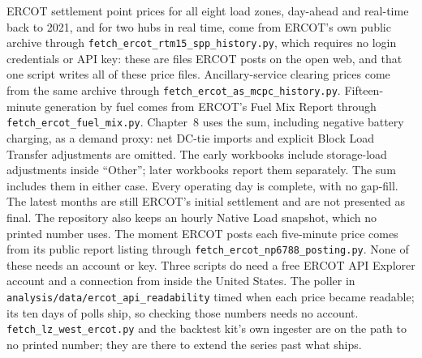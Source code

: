 ERCOT settlement point prices for all
eight load zones, day-ahead and real-time back to 2021, and for two hubs in real time, come from ERCOT's own
public archive through \texttt{fetch\_ercot\_rtm15\_spp\_history.py}, which
requires no login credentials or API key: these are files ERCOT posts on the
open web, and that one script writes all of these price files. Ancillary-service clearing
prices come from the same archive through
\texttt{fetch\_ercot\_as\_mcpc\_history.py}. Fifteen-minute generation by fuel comes from
ERCOT's Fuel Mix Report through \texttt{fetch\_ercot\_fuel\_mix.py}.
Chapter~8 uses the sum, including negative battery charging, as a demand proxy:
net DC-tie imports and explicit Block Load Transfer adjustments are omitted.
The early workbooks include storage-load adjustments inside ``Other''; later
workbooks report them separately. The sum includes them in either case.
Every operating day is complete, with no gap-fill.
The latest months are still ERCOT's initial settlement and are not presented as final. The repository also keeps an hourly Native Load snapshot, which no printed number uses.
The moment ERCOT posts each five-minute price comes from its public report
listing through \texttt{fetch\_ercot\_np6788\_posting.py}. None of these
needs an account or key. Three scripts do need a free ERCOT API
Explorer account and a connection from inside the United States. The poller in
\texttt{analysis/data/ercot\_api\_readability} timed when each price became
readable; its ten days of polls ship, so checking those numbers needs no
account. \texttt{fetch\_lz\_west\_ercot.py} and the backtest kit's own ingester
are on the path to no printed number; they are there to extend the series past
what ships. %

